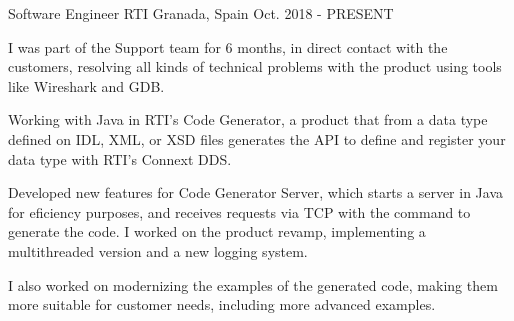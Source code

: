 

\begin{cventries}

  \cventry
    {Software Engineer} %
    {RTI} %
    {Granada, Spain} %
    {Oct. 2018 - PRESENT} %
    {
      \begin{cvitems} %
        \item {I was part of the Support team for 6 months, in direct contact with the customers,
              resolving all kinds of technical problems with the product using tools like Wireshark and GDB.} 
        \item {Working with Java in RTI’s Code Generator, a product that from a data type defined on IDL, XML, or XSD files
              generates the API to define and register your data type with RTI’s Connext DDS.}
        \item {Developed new features for Code Generator Server, which starts a server in Java for eficiency purposes,
              and receives requests via TCP with the command to generate the code. I worked on the product revamp,
              implementing a multithreaded version and a new logging system.}
        \item {I also worked on modernizing the examples of the generated code, 
              making them more suitable for customer needs, including more advanced examples.}
      \end{cvitems}
    }

\end{cventries}
